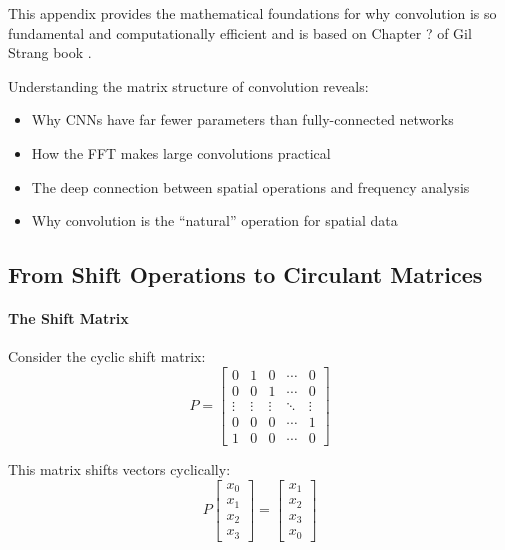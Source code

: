 \documentclass{article}
\begin{document}
This appendix provides the mathematical foundations for why convolution is so fundamental and computationally efficient and is based on Chapter ? of Gil Strang book \cite{}.

\begin{tcolorbox}[colback=yellow!5!white, colframe=orange!50!black, title=The Big Picture]
Understanding the matrix structure of convolution reveals:
\begin{itemize}
    \item Why CNNs have far fewer parameters than fully-connected networks
    \item How the FFT makes large convolutions practical
    \item The deep connection between spatial operations and frequency analysis
    \item Why convolution is the ``natural'' operation for spatial data
\end{itemize}
\end{tcolorbox}

\subsection{From Shift Operations to Circulant Matrices}

\paragraph{The Shift Matrix}

Consider the cyclic shift matrix:
\[
P = \begin{bmatrix}
0 & 1 & 0 & \cdots & 0 \\
0 & 0 & 1 & \cdots & 0 \\
\vdots & \vdots & \vdots & \ddots & \vdots \\
0 & 0 & 0 & \cdots & 1 \\
1 & 0 & 0 & \cdots & 0
\end{bmatrix}
\]

This matrix shifts vectors cyclically:
\[
P \begin{bmatrix} x_0 \\ x_1 \\ x_2 \\ x_3 \end{bmatrix} = \begin{bmatrix} x_1 \\ x_2 \\ x_3 \\ x_0 \end{bmatrix}
\]
\end{document}
